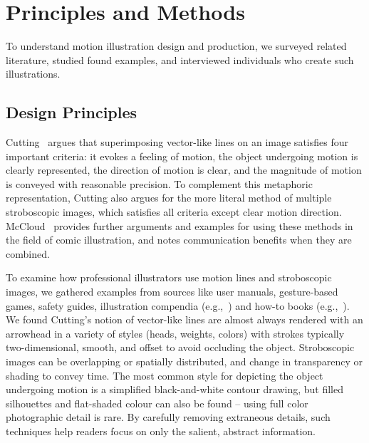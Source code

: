 
\section{Principles and Methods}

To understand motion illustration design and production, we surveyed related literature, studied found examples, and interviewed individuals who create such illustrations.

\subsection{Design Principles}
Cutting~\cite{cutting_representing_2002} argues that superimposing vector-like lines on an image satisfies four important criteria: it evokes a feeling of motion, the object undergoing motion is clearly represented, the direction of motion is clear, and the magnitude of motion is conveyed with reasonable precision. To complement this metaphoric representation, Cutting also argues for the more literal method of multiple stroboscopic images, which satisfies all criteria except clear motion direction. McCloud~\cite{mccloud_understanding_1994} provides further arguments and examples for using these methods in the field of comic illustration, and notes communication benefits when they are combined.

To examine how professional illustrators use motion lines and stroboscopic images, we gathered examples from sources like user manuals, gesture-based games, safety guides, %
illustration compendia (e.g.,~\cite{mijksenaar1999open}) and how-to books (e.g.,~\cite{greenberg2012sketching}).
%
We found Cutting's notion of vector-like lines are almost always rendered with an arrowhead %
in a variety of styles (heads, weights, colors) with strokes typically two-dimensional, smooth, and offset to avoid occluding the object.
Stroboscopic images can be overlapping or spatially distributed, and change in transparency or shading to convey time.
The most common style for depicting the object undergoing motion is a simplified black-and-white contour drawing, but filled silhouettes and flat-shaded colour can also be found -- using full color photographic detail is rare.
%
By carefully removing extraneous details, such techniques help readers focus on only the salient, abstract information.

